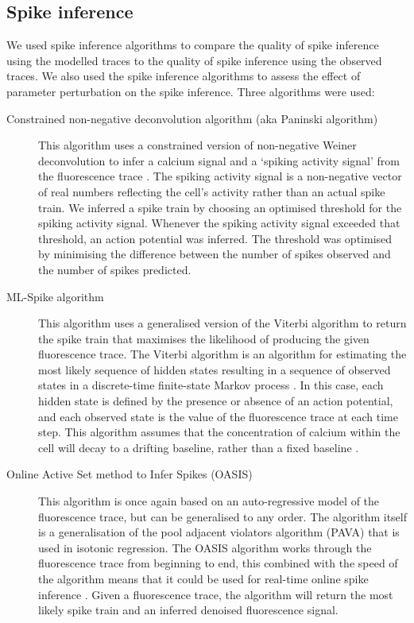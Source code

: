 \documentclass[a4paper,12pt]{article}
\theoremstyle{definition}
\begin{document}
\subsection{Spike inference}
We used spike inference algorithms to compare the quality of spike inference using the modelled traces to the quality of spike inference using the observed traces. We also used the spike inference algorithms to assess the effect of parameter perturbation on the spike inference. Three algorithms were used:
\begin{description}
    \item[Constrained non-negative deconvolution algorithm (aka Paninski algorithm)] This algorithm uses a constrained version of non-negative Weiner deconvolution to infer a calcium signal and a `spiking activity signal' from the fluorescence trace \cite{vogelstein, pnevmatikakis}. The spiking activity signal is a non-negative vector of real numbers reflecting the cell's activity rather than an actual spike train. We inferred a spike train by choosing an optimised threshold for the spiking activity signal. Whenever the spiking activity signal exceeded that threshold, an action potential was inferred. The threshold was optimised by minimising the difference between the number of spikes observed and the number of spikes predicted.
    \item[ML-Spike algorithm] This algorithm uses a generalised version of the Viterbi algorithm to return the spike train that maximises the likelihood of producing the given fluorescence trace. The Viterbi algorithm is an algorithm for estimating the most likely sequence of hidden states resulting in a sequence of observed states in a discrete-time finite-state Markov process \cite{forney}. In this case, each hidden state is defined by the presence or absence of an action potential, and each observed state is the value of the fluorescence trace at each time step. This algorithm assumes that the concentration of calcium within the cell will decay to a drifting baseline, rather than a fixed baseline \cite{deneux}.
    \item[Online Active Set method to Infer Spikes (OASIS)] This algorithm is once again based on an auto-regressive model of the fluorescence trace, but can be generalised to any order. The algorithm itself is a generalisation of the pool adjacent violators algorithm (PAVA) that is used in isotonic regression. The OASIS algorithm works through the fluorescence trace from beginning to end, this combined with the speed of the algorithm means that it could be used for real-time online spike inference \cite{friedrich}. Given a fluorescence trace, the algorithm will return the most likely spike train and an inferred denoised fluorescence signal.
\end{description}
\end{document}
